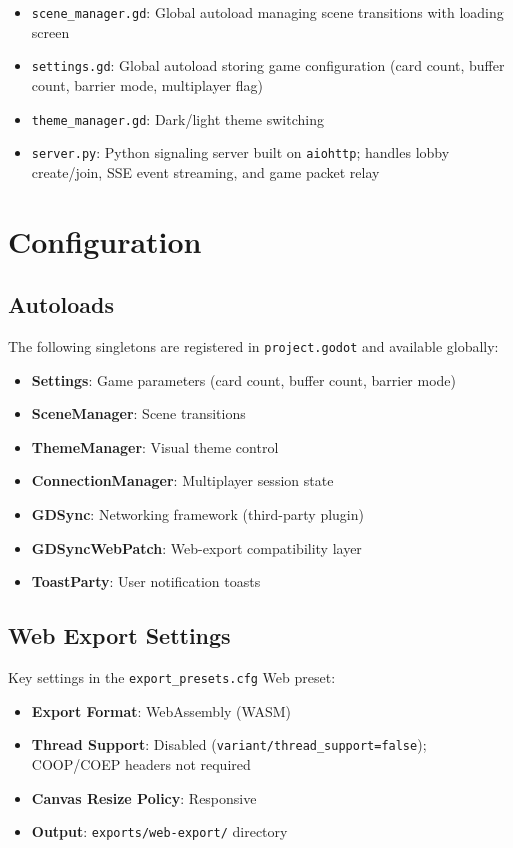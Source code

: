 \begin{itemize}
    \item \texttt{scene\_manager.gd}: Global autoload managing scene transitions with loading screen
    \item \texttt{settings.gd}: Global autoload storing game configuration (card count, buffer count, barrier mode, multiplayer flag)
    \item \texttt{theme\_manager.gd}: Dark/light theme switching
    \item \texttt{server.py}: Python signaling server built on \texttt{aiohttp}; handles lobby create/join, SSE event streaming, and game packet relay
\end{itemize}

\section{Configuration}
\label{app:b:configuration}

\subsection{Autoloads}

The following singletons are registered in \texttt{project.godot} and available globally:

\begin{itemize}
    \item \textbf{Settings}: Game parameters (card count, buffer count, barrier mode)
    \item \textbf{SceneManager}: Scene transitions
    \item \textbf{ThemeManager}: Visual theme control
    \item \textbf{ConnectionManager}: Multiplayer session state
    \item \textbf{GDSync}: Networking framework (third-party plugin)
    \item \textbf{GDSyncWebPatch}: Web-export compatibility layer
    \item \textbf{ToastParty}: User notification toasts
\end{itemize}

\subsection{Web Export Settings}

Key settings in the \texttt{export\_presets.cfg} Web preset:

\begin{itemize}
    \item \textbf{Export Format}: WebAssembly (WASM)
    \item \textbf{Thread Support}: Disabled (\texttt{variant/thread\_support=false}); COOP/COEP headers not required
    \item \textbf{Canvas Resize Policy}: Responsive
    \item \textbf{Output}: \texttt{exports/web-export/} directory
\end{itemize}

